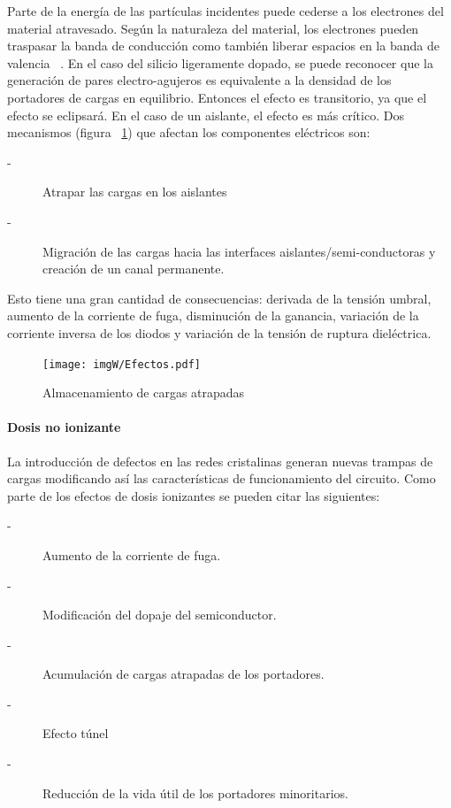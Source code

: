 \documentclass[a4paper,openright,12pt]{report}
\begin{document}
Parte de la energía de las partículas incidentes puede cederse a los electrones del material atravesado. Según la naturaleza del material, los electrones pueden traspasar la banda de conducción como también liberar espacios en la banda de valencia ~\cite{1208572}. En el caso del silicio ligeramente dopado, se puede reconocer que la generación de pares electro-agujeros es equivalente a la densidad de los portadores de cargas en equilibrio. Entonces el efecto es transitorio, ya que el efecto se eclipsará. En el caso de un aislante, el efecto es más crítico. Dos mecanismos (figura ~\ref{Efectos}) que afectan los componentes eléctricos son:
\begin{description}
\item[-] Atrapar las cargas en los aislantes  
\item[-] Migración de las cargas hacia las interfaces aislantes/semi-conductoras y creación de un canal permanente.

\end{description}
Esto tiene una gran cantidad de consecuencias: derivada de la tensión umbral, aumento de la corriente de fuga, disminución de la ganancia, variación de la corriente inversa de los diodos y variación de la tensión de ruptura dieléctrica.

\begin{figure}[H]
	\centering
	\texttt{[image: imgW/Efectos.pdf]}
	\caption{Almacenamiento de cargas atrapadas}
	\label{Efectos}
\end{figure}

\paragraph{Dosis no ionizante }\hfill \break

 La introducción de defectos en las redes cristalinas generan nuevas trampas de cargas modificando así las características de funcionamiento del circuito. Como parte de los efectos de dosis ionizantes se pueden citar las siguientes:

\begin{description}
\item[-] Aumento de la corriente de fuga.
\item[-] Modificación del dopaje del semiconductor.
\item[-] Acumulación de cargas atrapadas de los portadores.
\item[-] Efecto túnel
\item[-] Reducción de la vida útil de los portadores minoritarios.
\end{description}
\end{document}
